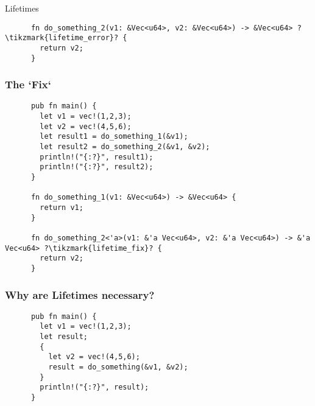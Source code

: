 \begin{section}{Lifetimes}
\begin{frame}[fragile]
\begin{verbatim}
      fn do_something_2(v1: &Vec<u64>, v2: &Vec<u64>) -> &Vec<u64> ?\tikzmark{lifetime_error}? {
        return v2;
      }
    \end{verbatim}
  \end{frame}

  \begin{frame}[fragile]
    \frametitle{The `Fix`}
    \begin{verbatim}
      pub fn main() {
        let v1 = vec!(1,2,3);
        let v2 = vec!(4,5,6);
        let result1 = do_something_1(&v1);
        let result2 = do_something_2(&v1, &v2);
        println!("{:?}", result1);
        println!("{:?}", result2);
      }

      fn do_something_1(v1: &Vec<u64>) -> &Vec<u64> {
        return v1;
      }

      fn do_something_2<'a>(v1: &'a Vec<u64>, v2: &'a Vec<u64>) -> &'a Vec<u64> ?\tikzmark{lifetime_fix}? {
        return v2;
      }
    \end{verbatim}
  \end{frame}

    \begin{frame}[fragile]
    \frametitle{Why are Lifetimes necessary? \cite{RustLangCh10}}
    \begin{verbatim}
      pub fn main() {
        let v1 = vec!(1,2,3);
        let result;
        {
          let v2 = vec!(4,5,6);
          result = do_something(&v1, &v2);
        }
        println!("{:?}", result);
      }


\end{verbatim}
\end{frame}
\end{section}
